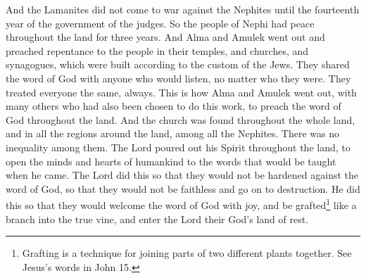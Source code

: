 \bverse \iffalse And the Lamanites did not come again to war against the Nephites until the fourteenth year of the reign of the judges over the people of Nephi. And thus for three years did the people of Nephi have continual peace in all the land. \fi
And the Lamanites did not come to war against the Nephites until the fourteenth year of the government of the judges. So the people of Nephi had peace throughout the land for three years.
\bverse \iffalse And Alma and Amulek went forth preaching repentance to the people in their temples, and in their sanctuaries, and also in their synagogues, which were built after the manner of the Jews. \fi
And Alma and Amulek went out and preached repentance to the people in their temples, and churches, and synagogues, which were built according to the custom of the Jews.
\bverse \iffalse And as many as would hear their words, unto them they did impart the word of God, without any respect of persons, continually. \fi
They shared the word of God with anyone who would listen, no matter who they were. They treated everyone the same, always.
\bverse \iffalse And thus did Alma and Amulek go forth, and also many more who had been chosen for the work, to preach the word throughout all the land. And the establishment of the church became general throughout the land, in all the region round about, among all the people of the Nephites. \fi
This is how Alma and Amulek went out, with many others who had also been chosen to do this work, to preach the word of God throughout the land. And the church was found throughout the whole land, and in all the regions around the land, among all the Nephites.
\bverse \iffalse And there was no inequality among them; the Lord did pour out his Spirit on all the face of the land to prepare the minds of the children of men, or to prepare their hearts to receive the word which should be taught among them at the time of his coming-- \fi
There was no inequality among them. The Lord poured out his Spirit throughout the land, to open the minds and hearts of humankind to the words that would be taught when he came.
\bverse \iffalse That they might not be hardened against the word, that they might not be unbelieving, and go on to destruction, but that they might receive the word with joy, and as a branch be grafted into the true vine, that they might enter into the rest of the Lord their God. \fi
The Lord did this so that they would not be hardened against the word of God, so that they would not be faithless and go on to destruction. He did this so that they would welcome the word of God with joy, and be grafted\footnote{Grafting is a technique for joining parts of two different plants together. See Jesus's words in John 15.} like a branch into the true vine, and enter the Lord their God's land of rest.
